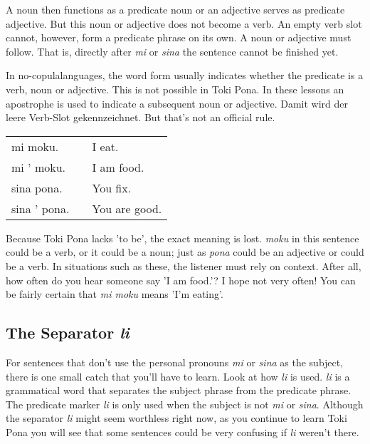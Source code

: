 A noun then functions as a predicate noun or an adjective serves as predicate adjective.
But this noun or adjective does not become a verb. 
An empty verb slot cannot, however, form a predicate phrase on its own. 
A noun or adjective must follow. 
That is, directly after \textit{mi} or \textit{sina} the sentence cannot be finished yet.

In no-copulalanguages, the word form usually indicates whether the predicate is a verb, noun or adjective. 
This is not possible in Toki Pona. 
In these lessons an apostrophe is used to indicate a subsequent noun or adjective. 
Damit wird der leere Verb-Slot gekennzeichnet. 
But that's not an official rule. 

\begin{supertabular}{p{5cm}|ll}
mi moku. && I eat.  \\
mi ' moku. && I am food. \\  
sina pona. && You fix. \\
sina ' pona. && You are good. \\  
\end{supertabular} 

Because Toki Pona lacks 'to be', the exact meaning is lost. 
\textit{moku} in this sentence could be a verb, or it could be a noun; just as \textit{pona} could be an adjective or could be a verb. 
In situations such as these, the listener must rely on context. 
After all, how often do you hear someone say 'I am food.'? 
I hope not very often! You can be fairly certain that \textit{mi moku} means 'I'm eating'. 
%
\subsection*{The Separator \textit{li} }
%
%
For sentences that don't use the personal pronouns \textit{mi} or \textit{sina} as the subject, there is one small catch that you'll have to learn. 
Look at how \textit{li} is used. 
\textit{li} is a grammatical word that separates the subject phrase from the predicate phrase. 
The predicate marker \textit{li} is only used when the subject is not \textit{mi} or \textit{sina}. 
Although the separator \textit{li} might seem worthless right now, as you continue to learn Toki Pona you will see that some sentences could be very confusing if \textit{li} weren't there. 

